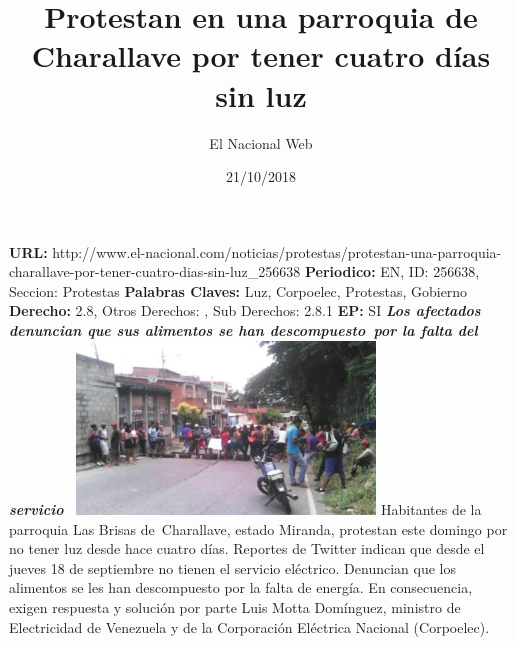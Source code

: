 \documentclass{article}%
\title{\textbf{Protestan en una parroquia de Charallave por tener cuatro días sin luz}}%
\author{El Nacional Web}%
\date{21/10/2018}%
\begin{document}
%
\normalsize%
\maketitle%
\textbf{URL: }%
http://www.el{-}nacional.com/noticias/protestas/protestan{-}una{-}parroquia{-}charallave{-}por{-}tener{-}cuatro{-}dias{-}sin{-}luz\_256638\newline%
%
\textbf{Periodico: }%
EN, %
ID: %
256638, %
Seccion: %
Protestas\newline%
%
\textbf{Palabras Claves: }%
Luz, Corpoelec, Protestas, Gobierno\newline%
%
\textbf{Derecho: }%
2.8, %
Otros Derechos: %
, %
Sub Derechos: %
2.8.1\newline%
%
\textbf{EP: }%
SI\newline%
\newline%
%
\textbf{\textit{Los afectados denuncian que sus alimentos se han descompuesto~por la falta del servicio~}}%
\newline%
\newline%
%
\includegraphics[width=300px]{68.jpg}%
\newline%
%
Habitantes de la parroquia Las Brisas de~Charallave, estado Miranda, protestan este domingo por no tener luz desde hace cuatro días.%
\newline%
%
Reportes de Twitter indican que desde el jueves 18 de septiembre no tienen el servicio eléctrico. Denuncian que los alimentos se les han descompuesto por la falta de energía.%
\newline%
%
En consecuencia, exigen respuesta y solución por parte Luis Motta Domínguez, ministro de Electricidad de Venezuela y de la Corporación Eléctrica Nacional (Corpoelec).%
\newline%
%
\end{document}
